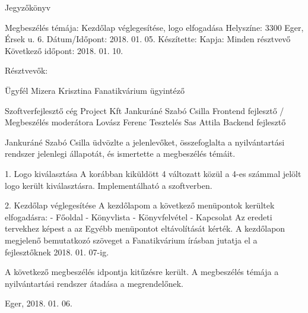 Jegyzőkönyv

Megbeszélés témája: Kezdőlap véglegesítése, logo elfogadása
Helyszíne: 3300 Eger, Érsek u. 6.
Dátum/Időpont: 2018. 01. 05.
Készítette: 
Kapja: Minden résztvevő
Következő időpont: 2018. 01. 10.


Résztvevők: 

Ügyfél
Mizera Krisztina			Fanatikvárium ügyintéző

Szoftverfejlesztő cég			Project Kft
Jankuráné Szabó Csilla 			Frontend fejlesztő / Megbeszélés moderátora 
Lovász Ferenc				Tesztelés
Sas Attila				Backend fejlesztő 

Jankuráné Szabó Csilla üdvözlte a jelenlevőket, összefoglalta a 
nyilvántartási rendszer jelenlegi állapotát, és ismertette a 
megbeszélés témáit.

1. Logo kiválasztása
	A korábban kiküldött 4 változatt közül a 4-es számmal jelölt 
	logo került kiválasztásra. Implementálható a szoftverben. 

2. Kezdőlap véglegesítése
	A kezdőlapom a következő menüpontok kerültek elfogadásra: 
		- Főoldal
		- Könyvlista
		- Könyvfelvétel
		- Kapcsolat
	Az eredeti tervekhez képest a az Egyébb menüpontot eltávolítását kérték. 
	A kezdőlapon megjelenő bemutatkozó szöveget a Fanatikvárium írásban jutatja 
	el a fejlesztőknek 2018. 01. 07-ig. 
	
A következő megbeszélés idpontja kitűzésre került. A megbeszélés témája
a nyilvántartási rendszer átadása a megrendelőnek. 
	
Eger, 2018. 01. 06.
